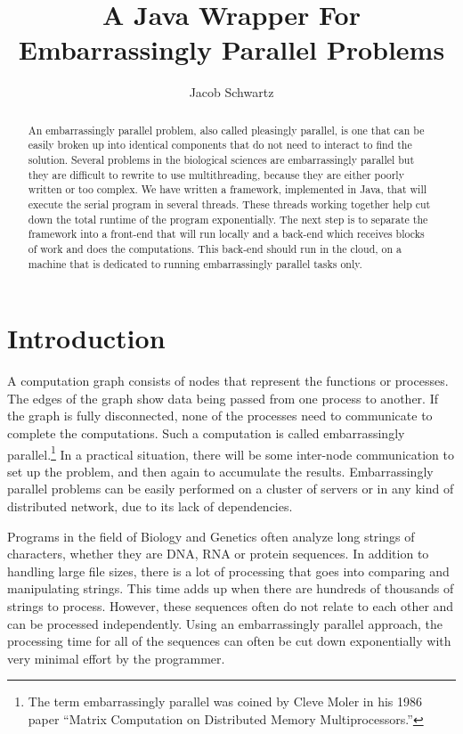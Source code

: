 \documentclass[12pt]{article}
\begin{document}
\title{A Java Wrapper For Embarrassingly Parallel Problems}
\author{Jacob Schwartz}
\maketitle

\begin{abstract}
An embarrassingly parallel problem, also called pleasingly parallel, is one that
can be easily broken up into identical components that do not need to interact
to find the solution. Several problems in the biological sciences are
embarrassingly parallel but they are difficult to rewrite to use multithreading,
because they are either poorly written or too complex. We have written a
framework, implemented in Java, that will execute the serial program in several
threads. These threads working together help cut down the total runtime of the
program exponentially. The next step is to separate the framework into a
front-end that will run locally and a back-end which receives blocks of work and
does the computations. This back-end should run in the cloud, on a machine that
is dedicated to running embarrassingly parallel tasks only.
\end{abstract}

\section{Introduction}

A computation graph consists of nodes that represent the functions or processes.
The edges of the graph show data being passed from one process to another. If
the graph is fully disconnected, none of the processes need to communicate to
complete the computations. Such a computation is called embarrassingly
parallel.\footnote{The term embarrassingly parallel was coined by Cleve Moler in
his 1986 paper ``Matrix Computation on Distributed Memory Multiprocessors.''} In
a practical situation, there will be some inter-node communication to set up the
problem, and then again to accumulate the results.  Embarrassingly parallel
problems can be easily performed on a cluster of servers or in any kind of
distributed network, due to its lack of dependencies. 

Programs in the field of Biology and Genetics often analyze long strings of
characters, whether they are DNA, RNA or protein sequences. In addition to
handling large file sizes, there is a lot of processing that goes into comparing
and manipulating strings. This time adds up when there are hundreds of thousands
of strings to process. However, these sequences often do not relate to each
other and can be processed independently. Using an embarrassingly parallel
approach, the processing time for all of the sequences can often be cut down
exponentially with very minimal effort by the programmer.
\end{document}
